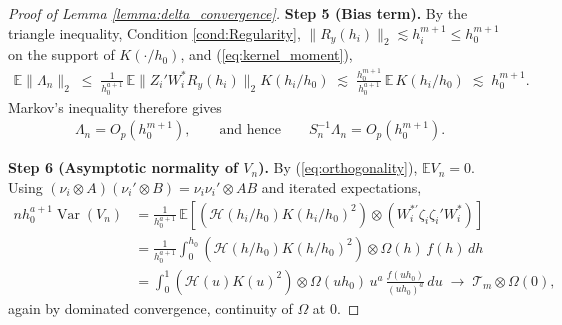 \documentclass{article}
\newcommand{\normm}[1]{\lVert#1\rVert}
\newcommand{\E}{\mathbb{E}}
\begin{document}
\begin{appendices}
\begin{proof}[Proof of Lemma \ref{lemma:delta_convergence}]
    \textbf{Step 5 (Bias term).}
    By the triangle inequality, Condition \ref{cond:Regularity},
    $\normm{R_y(h_i)}_2\lesssim h_i^{m+1}\le h_0^{m+1}$ on the support of
    $K(\cdot/h_0)$, and (\ref{eq:kernel_moment}),
    \begin{align*}
        \E\normm{\Lambda_n}_2
        \;\le\; \frac{1}{h_0^{a+1}}\,\E\normm{Z_i'W_i^{*}R_{y}(h_i)}_2 K(h_i/h_0)
        \;\lesssim\; \frac{h_0^{m+1}}{h_0^{a+1}}\,\E\,K(h_i/h_0)
        \;\lesssim\; h_0^{m+1}.
    \end{align*}
    Markov's inequality therefore gives
    \begin{align}\label{eq:delta_Lambda_convergence}
        \Lambda_n = O_p\!\left(h_0^{m+1}\right),
        \qquad\text{and hence}\qquad
        S_n^{-1}\Lambda_n = O_p\!\left(h_0^{m+1}\right).
    \end{align}
    
    \textbf{Step 6 (Asymptotic normality of $V_n$).}
    By (\ref{eq:orthogonality}), $\E V_n=0$. Using
    $(\nu_i\otimes A)(\nu_i'\otimes B)=\nu_i\nu_i'\otimes AB$ and iterated
    expectations,
    \begin{align*}
        nh_0^{a+1}\operatorname{Var}(V_n)
        &= \frac{1}{h_0^{a+1}}\,
        \E\left[\left(\mathcal{H}(h_i/h_0)K(h_i/h_0)^2\right)
        \otimes \left(W_i^{*\prime}\zeta_i\zeta_i'W_i^{*}\right)\right]\\
        &= \frac{1}{h_0^{a+1}}\int_{0}^{h_0}
        \left(\mathcal{H}(h/h_0)K(h/h_0)^2\right)\otimes\Omega(h)\,f(h)\,dh\\
        &= \int_{0}^{1}\left(\mathcal{H}(u)K(u)^2\right)\otimes\Omega(uh_0)\,u^{a}\,
        \frac{f(uh_0)}{(uh_0)^{a}}\,du
        \;\longrightarrow\; \mathcal{T}_m\otimes\Omega(0),
    \end{align*}
    again by dominated convergence, continuity of $\Omega$ at $0$.
    

\end{proof}
\end{appendices}
\end{document}
